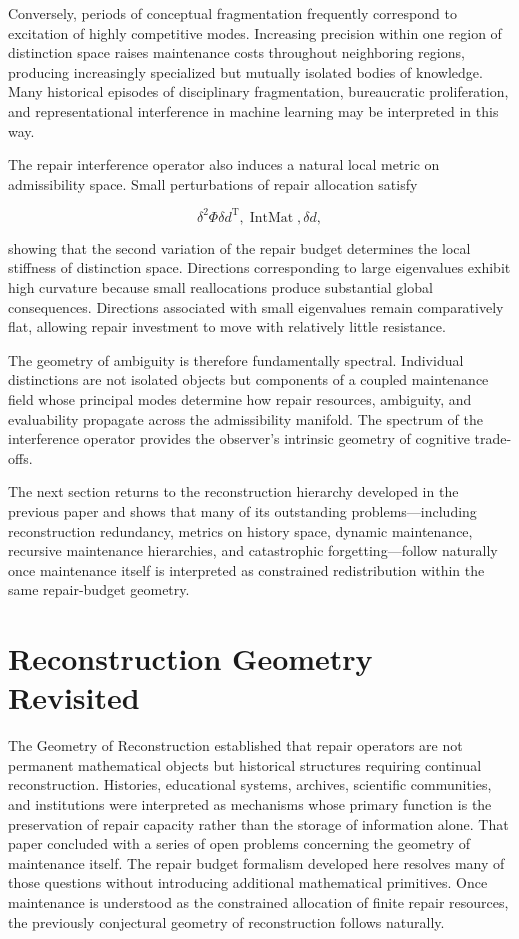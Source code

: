 \documentclass[12pt,oneside]{article}
\theoremstyle{plain}
\theoremstyle{definition}
\theoremstyle{remark}
\DeclareMathOperator{\IntMat}{IntMat}
\begin{document}
Conversely, periods of conceptual fragmentation frequently correspond to excitation of highly competitive modes. Increasing precision within one region of distinction space raises maintenance costs throughout neighboring regions, producing increasingly specialized but mutually isolated bodies of knowledge. Many historical episodes of disciplinary fragmentation, bureaucratic proliferation, and representational interference in machine learning may be interpreted in this way.

The repair interference operator also induces a natural local metric on admissibility space. Small perturbations of repair allocation satisfy

\[
\delta^2\Phi
\delta d^{\mathrm T}
,
\IntMat
,
\delta d,
\]

showing that the second variation of the repair budget determines the local stiffness of distinction space. Directions corresponding to large eigenvalues exhibit high curvature because small reallocations produce substantial global consequences. Directions associated with small eigenvalues remain comparatively flat, allowing repair investment to move with relatively little resistance.

The geometry of ambiguity is therefore fundamentally spectral. Individual distinctions are not isolated objects but components of a coupled maintenance field whose principal modes determine how repair resources, ambiguity, and evaluability propagate across the admissibility manifold. The spectrum of the interference operator provides the observer's intrinsic geometry of cognitive trade-offs.

The next section returns to the reconstruction hierarchy developed in the previous paper and shows that many of its outstanding problems—including reconstruction redundancy, metrics on history space, dynamic maintenance, recursive maintenance hierarchies, and catastrophic forgetting—follow naturally once maintenance itself is interpreted as constrained redistribution within the same repair-budget geometry.

\section{Reconstruction Geometry Revisited}

The Geometry of Reconstruction established that repair operators are not permanent mathematical objects but historical structures requiring continual reconstruction. Histories, educational systems, archives, scientific communities, and institutions were interpreted as mechanisms whose primary function is the preservation of repair capacity rather than the storage of information alone. That paper concluded with a series of open problems concerning the geometry of maintenance itself. The repair budget formalism developed here resolves many of those questions without introducing additional mathematical primitives. Once maintenance is understood as the constrained allocation of finite repair resources, the previously conjectural geometry of reconstruction follows naturally.
\end{document}
